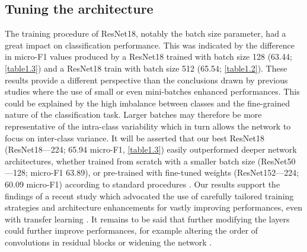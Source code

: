 \subsection{Tuning the architecture}\label{chapitre1_7.2}
The training procedure of ResNet18, notably the batch size parameter, had a great impact on classification performance. This was indicated by the difference in micro-F1 values produced by a ResNet18 trained with batch size 128 (63.44; \autoref{table1.3}) and a ResNet18 train with batch size 512 (65.54; \autoref{table1.2}). These results provide a different perspective than the conclusions drawn by previous studies \citep{masters_revisiting_2018, mishkin_systematic_2016} where the use of small or even mini-batches enhanced performances. This could be explained by the high imbalance between classes and the fine-grained nature of the classification task. Larger batches may therefore be more representative of the intra-class variability which in turn allows the network to focus on inter-class variance. It will be asserted that our best ResNet18 (ResNet18---224; 65.94 micro-F1, \autoref{table1.3}) easily outperformed deeper network architectures, whether trained from scratch with a smaller batch size (ResNet50---128; micro-F1 63.89), or pre-trained with fine-tuned weights (ResNet152---224; 60.09 micro-F1) according to standard procedures \citep{king_comparison_2018}. Our results support the findings of a recent study which advocated the use of carefully tailored training strategies and architecture enhancements for vastly improving performances, even with transfer learning \citep{he_bag_2019}. It remains to be said that further modifying the layers could further improve performances, for example altering the order of convolutions in residual blocks \citep{he_bag_2019} or widening the network \citep{zagoruyko_wide_2016}.

